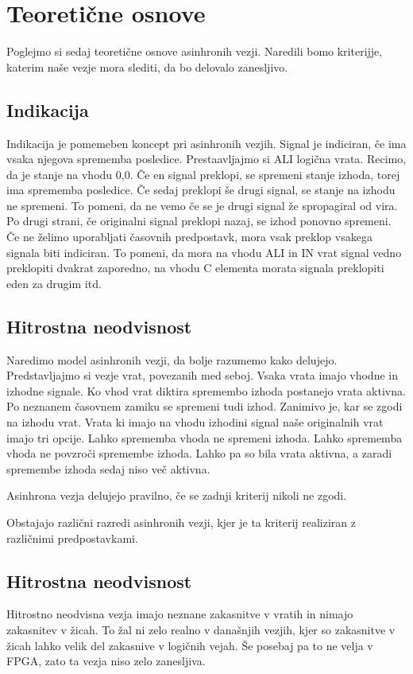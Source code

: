 \section{Teoretične osnove} \label{a}
Poglejmo si sedaj teoretične osnove asinhronih vezji. Naredili bomo kriterijje, katerim naše vezje mora slediti, da bo delovalo zanesljivo.



\subsection{Indikacija} \label{b}

Indikacija je pomemeben koncept pri asinhronih vezjih. Signal je indiciran, če ima vsaka njegova sprememba posledice. Prestaavljajmo si ALI logična vrata. Recimo, da je stanje na vhodu 0,0. Če en signal preklopi, se spremeni stanje izhoda, torej ima sprememba posledice. Če sedaj preklopi še drugi signal, se stanje na izhodu ne spremeni. To pomeni, da ne vemo če se je drugi signal že spropagiral od vira. Po drugi strani, če originalni signal preklopi nazaj, se izhod ponovno spremeni. Če ne želimo uporabljati časovnih predpostavk, mora vsak preklop vsakega signala biti indiciran. To pomeni, da mora na vhodu ALI in IN vrat signal vedno preklopiti dvakrat zaporedno, na vhodu C elementa morata signala preklopiti eden za drugim itd. 

\subsection{Hitrostna neodvisnost} \label{b}

Naredimo model asinhronih vezji, da bolje razumemo kako delujejo. Predstavljajmo si vezje vrat, povezanih med seboj. Vsaka vrata imajo vhodne in izhodne signale. Ko vhod vrat diktira spremembo izhoda postanejo vrata aktivna. Po neznanem časovnem zamiku se spremeni tudi izhod. Zanimivo je, kar se zgodi na izhodu vrat. Vrata ki imajo na vhodu izhodini signal naše originalnih vrat imajo tri opcije.
Lahko sprememba vhoda ne spremeni izhoda.
Lahko sprememba vhoda ne povzroči spremembe izhoda.
Lahko pa so bila vrata aktivna, a zaradi spremembe izhoda sedaj niso več aktivna.

Asinhrona vezja delujejo pravilno, če se zadnji kriterij nikoli ne zgodi.

Obstajajo različni razredi asinhronih vezji, kjer je ta kriterij realiziran z različnimi predpostavkami.

\subsection{Hitrostna neodvisnost} \label{b}
Hitrostno neodvisna vezja imajo neznane zakasnitve v vratih in nimajo zakasnitev v žicah. To žal ni zelo realno v današnjih vezjih, kjer so zakasnitve v žicah lahko velik del zakasnive v logičnih vejah. Še posebaj pa to ne velja v FPGA, zato ta vezja niso zelo zanesljiva.

